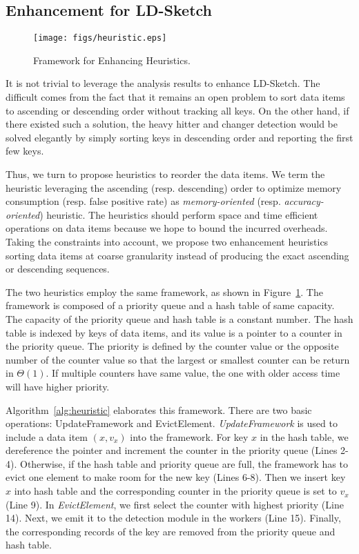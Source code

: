 \subsection{Enhancement for LD-Sketch}
\label{sec:new_algorithms}

\begin{figure}[t]
\centering
\texttt{[image: figs/heuristic.eps]}
\caption{Framework for Enhancing Heuristics.}
\label{fig:heuristic}
\vspace{-1em}
\end{figure}

It is not trivial to leverage the analysis results to enhance LD-Sketch.
The difficult comes from the fact that it remains an open problem to sort data items to ascending or 
descending order without tracking all keys.
On the other hand, if there existed such a solution, the heavy hitter and changer detection
would be solved elegantly by simply sorting keys in descending order and reporting the first few keys.

Thus, we turn to propose heuristics to reorder the data items.
We term the heuristic leveraging the ascending (resp. descending) order to optimize memory consumption (resp. false positive rate)
as {\em memory-oriented} (resp. {\em accuracy-oriented}) heuristic.
The heuristics should perform space and time efficient operations on data items
because we hope to bound the incurred overheads.
Taking the constraints into account, we propose two enhancement heuristics sorting data items
at coarse granularity instead of producing the exact ascending or descending sequences.

The two heuristics employ the same framework, as shown in Figure~\ref{fig:heuristic}.
The framework is composed of a priority queue and a hash table of same capacity.
The capacity of the priority queue and hash table is a constant number.
The hash table is indexed by keys of data items, and its value is a pointer to a 
counter in the priority queue.
The priority is defined by the counter value or the opposite number of the counter value
so that the largest or smallest counter can be return in $\Theta(1)$.
If multiple counters have same value, the one with older access time will have higher priority.

Algorithm~\ref{alg:heuristic} elaborates this framework.
There are two basic operations: UpdateFramework and EvictElement.
{\em UpdateFramework} is used to include a data item $(x, v_x)$ into the framework.
For key $x$ in the hash table, we dereference the pointer and increment the counter in the priority queue (Lines 2-4).
Otherwise, if the hash table and priority queue are full, the framework has to evict one element
to make room for the new key (Lines 6-8).
Then we insert key $x$ into hash table and the corresponding counter in the priority queue is set to $v_x$ (Line 9).
In {\em EvictElement}, we first select the counter with highest priority (Line 14).
Next, we emit it to the detection module in the workers (Line 15).
Finally, the corresponding records of the key are removed from the priority queue and hash table.

